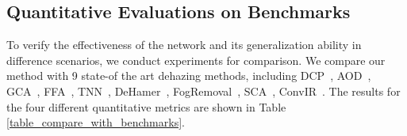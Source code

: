 \documentclass[journal]{IEEEtran}
\begin{document}
\subsection{Quantitative Evaluations on Benchmarks}
To verify the effectiveness of the network and its generalization ability in difference scenarios, we conduct experiments for comparison. We compare our method with 9 state-of the art dehazing methods, including DCP~\cite{he2010single}, AOD~\cite{li2017aod}, GCA~\cite{chen2019gated}, FFA~\cite{qin2020ffa}, TNN~\cite{yu2021two}, DeHamer~\cite{guo2022image}, FogRemoval~\cite{jin2022structure}, SCA~\cite{guo2023scanet}, ConvIR~\cite{cui2024revitalizing}. The results for the four different quantitative metrics are shown in Table \ref{table_compare_with_benchmarks}.

\begin{table}
	\begin{center}
		\caption{Quantitative Comparison Results of Various Dehazing Methods and Proposed Method on I-HAZE, O-HAZE, DENSE-HAZE, NH-HAZE-20, NH-HAZE-21 and NH-HAZE-23. \textbf{Bold} Indicates the Best and \underline{Underline} Indicates the Second Best.}
		\label{table_compare_with_benchmarks}
\end{center}
\end{table}
\end{document}
